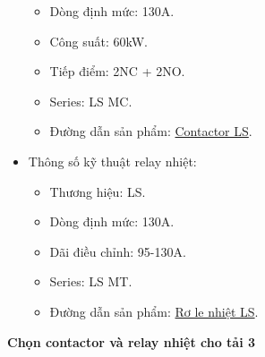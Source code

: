 \begin{itemize}
\begin{itemize}
                            \item Dòng định mức: 130A.
                            \item Công suất: 60kW.
                            \item Tiếp điểm: 2NC + 2NO.
                            \item Series: LS MC.
                            \item Đường dẫn sản phẩm: \href{https://codienhaiau.com/product/contactor-ls-mc-130a-60kw-2no2nc-coil-380v/}{Contactor LS}.
                        \end{itemize}
                    \item Thông số kỹ thuật relay nhiệt:
                        \begin{itemize}
                            \item Thương hiệu: LS.
                            \item Dòng định mức: 130A.
                            \item Dãi điều chỉnh: 95-130A.
                            \item Series: LS MT.
                            \item Đường dẫn sản phẩm: \href{https://codienhaiau.com/product/ro-le-nhiet-ls-mt-150-95-130a/}{Rơ le nhiệt LS}.
                        \end{itemize}
                \end{itemize}
            \textbf{Chọn contactor và relay nhiệt cho tải 3}
